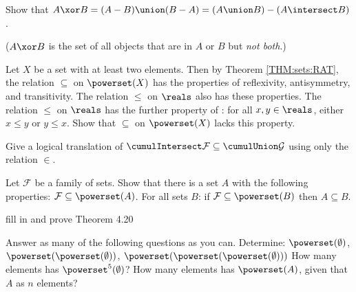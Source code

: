 \begin{Exercise} [number=21]
  Show that $A \xor B = (A - B) \union (B - A) = (A \union B) - (A
  \intersect B)$.
  
  ($A \xor B$ is the set of all objects that are in $A$ or $B$ but
  \emph{not both}.)
\end{Exercise}

\begin{Answer}
  \begin{structured_derivation}
  \end{structured_derivation}
\end{Answer}

\begin{Exercise} [number=23] 
  Let $X$ be a set with at least two elements. Then by Theorem \ref{THM:sets:RAT},
  the relation $\subseteq$ on $\powerset(X)$ has the properties of reflexivity,
  antisymmetry, and transitivity. The relation $\leq$ on $\reals$ also has these
  properties. The relation $\leq$ on $\reals$ has the further property of 
  : for all $x, y \in \reals$, either $x \leq y$ or $y \leq x$.
  Show that $\subseteq$ on $\powerset(X)$ lacks this property.
\end{Exercise}

\begin{Exercise} [number=26]
  Give a logical translation of $\cumulIntersect \mathcal{F} \subseteq
  \cumulUnion \mathcal{G}$ using only the relation $\in$.
\end{Exercise}

\begin{Exercise} [number=27]
  Let $\mathcal{F}$ be a family of sets. Show that there is a set $A$ with the 
  following properties:
  \Question $\mathcal{F} \subseteq \powerset(A)$.
  \Question For all sets $B$: if $\mathcal{F} \subseteq \powerset(B)$ then $A \subseteq B$.
\end{Exercise}

\begin{Exercise} [number=29]
  fill in and prove Theorem 4.20
\end{Exercise}

\begin{Exercise} [number=30]
Answer as many of the following questions as you can.
\Question Determine: $\powerset(\emptyset)$, $\powerset(\powerset(\emptyset))$, $\powerset(\powerset(\powerset(\emptyset)))$
\Question How many elements has $\powerset^{5}(\emptyset)$?
\Question How many elements has $\powerset(A)$, given that $A$ as $n$ elements?
\end{Exercise}

